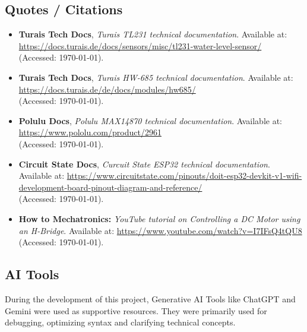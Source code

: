 \documentclass[paper=a4,fontsize=12pt,ngerman]{scrartcl}
\begin{document}
\clearpage %



\newpage
\subsection{Quotes / Citations}




\begin{itemize}
    
    \item \textbf{Turais Tech Docs}, \textit{Turais TL231 technical documentation}. Available at: \url{https://docs.turais.de/docs/sensors/misc/tl231-water-level-sensor/} \\
    (Accessed: \today).

    \item \textbf{Turais Tech Docs}, \textit{Turais HW-685 technical documentation}. Available at: \url{https://docs.turais.de/de/docs/modules/hw685/} \\(Accessed: \today).
    
    \item \textbf{Polulu Docs}, \textit{Polulu MAX14870 technical documentation}. Available at: \url{https://www.pololu.com/product/2961} \\
    (Accessed: \today).

    \item \textbf{Circuit State Docs}, \textit{Curcuit State ESP32 technical documentation}. Available at: \url{https://www.circuitstate.com/pinouts/doit-esp32-devkit-v1-wifi-development-board-pinout-diagram-and-reference/} \\
    (Accessed: \today).

    
    \item \textbf{How to Mechatronics: }\textit{YouTube tutorial on Controlling a DC Motor using an H-Bridge}. Available at: \url{https://www.youtube.com/watch?v=I7IFsQ4tQU8} \\
    (Accessed: \today).
    
\end{itemize}

\subsection{AI Tools}

During the development of this project, Generative AI Tools like ChatGPT and Gemini were used as supportive resources. They were primarily used for debugging, optimizing syntax and clarifying technical concepts.

\clearpage
\appendix
\end{document}

